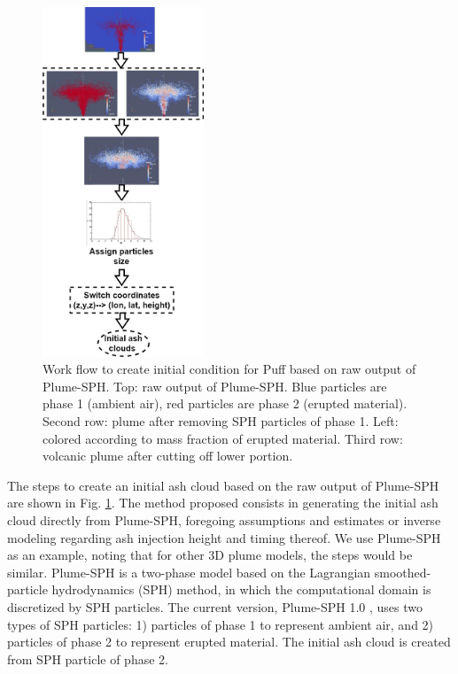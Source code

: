 \documentclass[draft,linenumbers]{agujournal2019}
\begin{document}
\begin{figure}
\center
\includegraphics[width=0.43\textwidth]{Figures/Creat_initial_Ash}
\caption{Work flow to create initial condition for Puff based on raw output of Plume-SPH. Top:  raw output of Plume-SPH. Blue particles are phase 1 (ambient air), red particles are  phase 2 (erupted material).  Second row: plume after removing SPH particles of phase 1. Left: colored according to mass fraction of erupted material. Third row:  volcanic plume after cutting off lower portion.}
\label{fig:create-initial-ash-plume-sph}
\end{figure}

The steps to create an initial ash cloud based on the raw output of Plume-SPH are shown in Fig. \ref{fig:create-initial-ash-plume-sph}.
The method proposed consists in generating the initial ash cloud directly from Plume-SPH, foregoing  assumptions and estimates or  inverse modeling regarding ash injection height and timing thereof.
We use Plume-SPH as an example, noting that for other 3D plume models, the steps would be similar. Plume-SPH is a two-phase model based on the Lagrangian smoothed-particle hydrodynamics (SPH) method, in which the computational domain is discretized by SPH particles. The current version, Plume-SPH 1.0 \citep{cao2018plume}, uses two types of SPH particles: 1) particles of phase 1 to represent ambient air, and 2) particles of phase 2 to represent erupted material. The initial ash cloud is created from SPH particle of phase 2.
\end{document}
